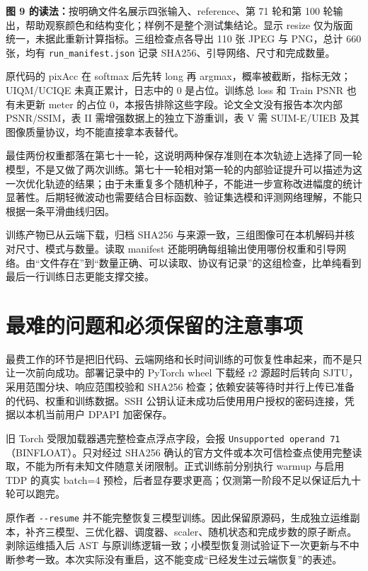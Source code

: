 \documentclass[UTF8,11pt,a4paper,fontset=windows]{ctexart}
\begin{document}
\textbf{图 9 的读法：}按明确文件名展示四张输入、reference、第 71 轮和第 100 轮输出，帮助观察颜色和结构变化；样例不是整个测试集结论。显示 resize 仅为版面统一，未据此重新计算指标。三组检查点各导出 110 张 JPEG 与 PNG，总计 660 张，均有 \texttt{run\_\allowbreak{}manifest\allowbreak{}.\allowbreak{}json} 记录 SHA256、引导网络、尺寸和完成数量。

原代码的 pixAcc 在 softmax 后先转 long 再 argmax，概率被截断，指标无效；UIQM/UCIQE 未真正累计，日志中的 0 是占位。训练总 loss 和 Train PSNR 也有未更新 meter 的占位 0，本报告排除这些字段。论文全文没有报告本次内部 PSNR/SSIM，表 II 需增强数据上的独立下游重训，表 V 需 SUIM-E/UIEB 及其图像质量协议，均不能直接拿本表替代。

最佳两份权重都落在第七十一轮，这说明两种保存准则在本次轨迹上选择了同一轮模型，不是又做了两次训练。第七十一轮相对第一轮的内部验证提升可以描述为这一次优化轨迹的结果；由于未重复多个随机种子，不能进一步宣称改进幅度的统计显著性。后期轻微波动也需要结合目标函数、验证集选模和评测网络理解，不能只根据一条平滑曲线归因。

训练产物已从云端下载，归档 SHA256 与来源一致，三组图像可在本机解码并核对尺寸、模式与数量。读取 manifest 还能明确每组输出使用哪份权重和引导网络。由“文件存在”到“数量正确、可以读取、协议有记录”的这组检查，比单纯看到最后一行训练日志更能支撑交接。

\section{最难的问题和必须保留的注意事项}

最费工作的环节是把旧代码、云端网络和长时间训练的可恢复性串起来，而不是只让一次前向成功。部署记录中的 PyTorch wheel 下载经 r2 源超时后转向 SJTU，采用范围分块、响应范围校验和 SHA256 检查；依赖安装等待时并行上传已准备的代码、权重和训练数据。SSH 公钥认证未成功后使用用户授权的密码连接，凭据以本机当前用户 DPAPI 加密保存。

旧 Torch 受限加载器遇完整检查点浮点字段，会报 \texttt{Unsupported \allowbreak{}operand 71}（BINFLOAT）。只对经过 SHA256 确认的官方文件或本次可信检查点使用完整读取，不能为所有未知文件随意关闭限制。正式训练前分别执行 warmup 与启用 TDP 的真实 batch=4 预检，后者显存要求更高；仅测第一阶段不足以保证后九十轮可以跑完。

原作者 \texttt{-\allowbreak{}-\allowbreak{}resume} 并不能完整恢复三模型训练。因此保留原源码，生成独立运维副本，补齐三模型、三优化器、调度器、scaler、随机状态和完成步数的原子断点。剥除运维插入后 AST 与原训练逻辑一致；小模型恢复测试验证下一次更新与不中断参考一致。本次实际没有重启，这不能变成“已经发生过云端恢复”的表述。
\end{document}
